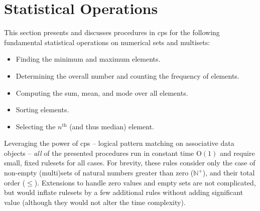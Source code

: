 

\section{Statistical Operations}\label{sec:cps:stats}

This section presents and discusses procedures in \gls{cps} for the following fundamental statistical operations on numerical sets and multisets:
\begin{itemize}
    \item Finding the minimum and maximum elements.
    \item Determining the overall number and counting the frequency of elements.
    \item Computing the sum, mean, and mode over all elements.
    \item Sorting elements.
    \item Selecting the \(n^{\text{th}}\) (and thus median) element.
\end{itemize}

Leveraging the power of \gls{cps} -- logical pattern matching on associative data objects -- \emph{all} of the presented procedures run in constant time O\((1)\) and require small, fixed \glspl{ruleset} for all cases.  For brevity, these rules consider only the case of non-empty (multi)sets of natural numbers greater than zero (\(\mathbb{N}^+\)), and their total order (\(\leq\)).  Extensions to handle zero values and empty sets are not complicated, but would inflate \glspl{ruleset} by a few additional rules without adding significant value (although they would not alter the time complexity).

